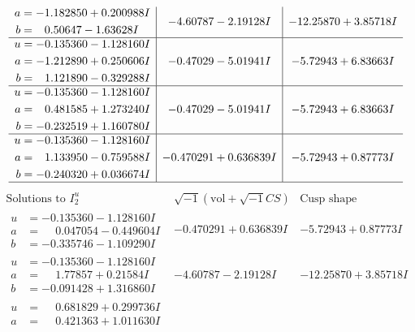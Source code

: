 \documentclass[1p]{elsarticle_modified}
\theoremstyle{definition}
\newcommand{\I}{\sqrt{-1}}
\begin{document}
$$\begin{array}{c|c|c}
\begin{aligned}
a &= -1.182850 + 0.200988 I \\
b &= \phantom{-}0.50647 - 1.63628 I\end{aligned}
 & -4.60787 - 2.19128 I & -12.25870 + 3.85718 I \\ \hline\begin{aligned}
u &= -0.135360 - 1.128160 I \\
a &= -1.212890 + 0.250606 I \\
b &= \phantom{-}1.121890 - 0.329288 I\end{aligned}
 & -0.47029 - 5.01941 I & -5.72943 + 6.83663 I \\ \hline\begin{aligned}
u &= -0.135360 - 1.128160 I \\
a &= \phantom{-}0.481585 + 1.273240 I \\
b &= -0.232519 + 1.160780 I\end{aligned}
 & -0.47029 - 5.01941 I & -5.72943 + 6.83663 I \\ \hline\begin{aligned}
u &= -0.135360 - 1.128160 I \\
a &= \phantom{-}1.133950 - 0.759588 I \\
b &= -0.240320 + 0.036674 I\end{aligned}
 & -0.470291 + 0.636839 I & -5.72943 + 0.87773 I\\
 \hline 
 \end{array}$$\newpage$$\begin{array}{c|c|c}  
\text{Solutions to }I^u_{2}& \I (\text{vol} + \sqrt{-1}CS) & \text{Cusp shape}\\
 \hline 
\begin{aligned}
u &= -0.135360 - 1.128160 I \\
a &= \phantom{-}0.047054 - 0.449604 I \\
b &= -0.335746 - 1.109290 I\end{aligned}
 & -0.470291 + 0.636839 I & -5.72943 + 0.87773 I \\ \hline\begin{aligned}
u &= -0.135360 - 1.128160 I \\
a &= \phantom{-}1.77857 + 0.21584 I \\
b &= -0.091428 + 1.316860 I\end{aligned}
 & -4.60787 - 2.19128 I & -12.25870 + 3.85718 I \\ \hline\begin{aligned}
u &= \phantom{-}0.681829 + 0.299736 I \\
a &= \phantom{-}0.421363 + 1.011630 I \\

\end{aligned}
\end{array}$$
\end{document}
